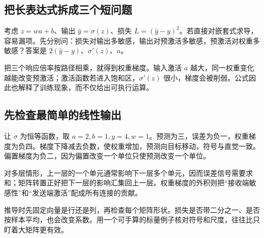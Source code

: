 \subsection*{把长表达式拆成三个短问题}
考虑 $z=wa+b$、输出 $\hat y=\sigma(z)$、损失 $L=(\hat y-y)^2$。若直接对嵌套式求导，容易漏项。先分别问：损失对输出多敏感，输出对预激活多敏感，预激活对权重多敏感？答案是 $2(\hat y-y)$、$\sigma'(z)$、$a$。

把三个响应倍率按路径相乘，就得到权重梯度。输入激活 $a$ 越大，同一权重变化越能改变预激活；激活函数若进入饱和区，$\sigma'(z)$ 很小，梯度会被削弱。公式因此也解释了训练现象，而不仅给出可执行运算。

\subsection*{先检查最简单的线性输出}
让 $\sigma$ 为恒等函数，取 $a=2,b=1,y=4,w=1$。预测为三，误差为负一，权重梯度为负四。梯度下降减去负数，使权重增加，预测向目标移动，符号与直觉一致。偏置梯度为负二，因为偏置改变一个单位只使预测改变一个单位。

对多层情形，上一层的一个单元通常影响下一层多个单元，因而误差信号需要求和；矩阵转置正好把下一层的影响汇集回上一层。权重梯度的外积则把“接收端敏感性”和“发送端激活”配成所有连接的贡献。

推导时先固定向量是行还是列，再检查每个矩阵形状。损失是否带二分之一、是否按样本平均，也会改变系数。用一个可手算的标量例子核对符号和尺度，往往比只盯着大矩阵更有效。
